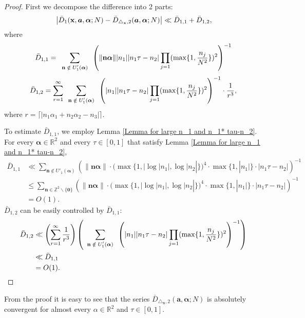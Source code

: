 \documentclass[11pt]{article}
\newcommand{\beq}{\begin{equation}}
\newcommand{\eeq}{\end{equation}}
\newcommand{\fc}{\frac}
\renewcommand{\l}{\left}
\renewcommand{\r}{\right}
\newcommand{\Z}{\mathbb{Z}}
\newcommand{\R}{\mathbb{R}}
\renewcommand{\a}{\alpha}
\renewcommand{\(}{\left(}
\renewcommand{\)}{\right)}
\renewcommand{\bf}{\mathbf}
\newcommand{\ba}{\begin{array}}
\newcommand{\ea}{\end{array}}
\newcommand{\bal}{\begin{aligned}}
\newcommand{\eal}{\end{aligned}}
\newcommand{\n}{\bf{n}}
\newcommand{\bma}{\bm{\alpha}}
\newcommand{\Dbartwo}{\bar{D}_{\triangle_{\bf{x}},2} (\bm{a},\bm{\a};N)}
\newcommand{\<}{\langle}
\renewcommand{\>}{\rangle}
\begin{document}
\begin{proof}
First we decompose the difference into 2 parts:
\beq{\label{D1=D11+D22}}
\l|\bar{D}_1(\bf{x},\bm{a},\bm{\a};N)-\Dbartwo\r|\ll\bar{D}_{1,1} +\bar{D}_{1,2},
\eeq
where 
$$
\bar{D}_{1,1}=\sum_{\mbox{\scriptsize $\ba{c} \n\notin U'_1(\bm{\a})  \\
 \ea$}}
  \l( \|\n\bma\| |n_1|  |n_1\tau-n_2| \prod_{j=1}(\max\{1,\fc{n_j}{N^2}\})^2 \r)^{-1}
 $$
$$
\bar{D}_{1,2}=\sum_{r=1}^{\infty}\sum_{ \mbox{\scriptsize $\ba{c} \n\notin U'_1(\bm{\a})
 \ea$}}
  \l( |n_1|  |n_1\tau-n_2| \prod_{j=1}(\max\{1,\fc{n_j}{N^2}\})^2 \r)^{-1}\cdot \fc{1}{r^3},
$$
where $r=\lceil |n_1\a_1+n_2\a_2-n_3|\rceil$.

To estimate $\bar{D}_{1,1}$, we employ Lemma \ref{Lemma for large n_1 and n_1* tau-n_2}. For every $\bma\in\R^2$ and every $\tau\in [0,1]$ that satisfy Lemma \ref{Lemma for large n_1 and n_1* tau-n_2},
$$
\bal
\bar{D}_{1,1} 
&\ll\sum_{\n\notin U'_1(\bm{\a})}  \l(\|\n\bma\|\cdot (\max\{1,|\log |n_1|,\log |n_2|\})^{4} \cdot \max\{1,|n_1|\}\cdot |n_1\tau-n_2|\r)^{-1}\\
&
\le \sum_{\n\in\Z^2\backslash \{\bf{0}\}} \l(\|\n\bma\|\cdot (\max\{1,|\log |n_1|,\log |n_2|\})^{4} \cdot \max\{1,|n_1|\}\cdot |n_1\tau-n_2|\r)^{-1}\\
&=O(1).
\eal
$$
$\bar{D}_{1,2}$ can be easily controlled by $\bar{D}_{1,1}$:
$$
\bal
\bar{D}_{1,2} 
&\ll \l(\sum_{r=1}^{\infty} \fc{1}{r^3}\r)\l(\sum_{ \mbox{\scriptsize $\ba{c} \n\notin U'_1(\bm{\a})
 \ea$}}  \l( |n_1|  |n_1\tau-n_2| \prod_{j=1}(\max\{1,\fc{n_j}{N^2}\})^2 \r)^{-1}\r) \\
& \ll \bar{D}_{1,1} \\
& =O(1).
\eal
$$
\end{proof}

From the proof it is easy to see that the series $\Dbartwo$ is absolutely convergent for almost every $\a\in \R^2$ and $\tau\in[0,1]$.
\end{document}
